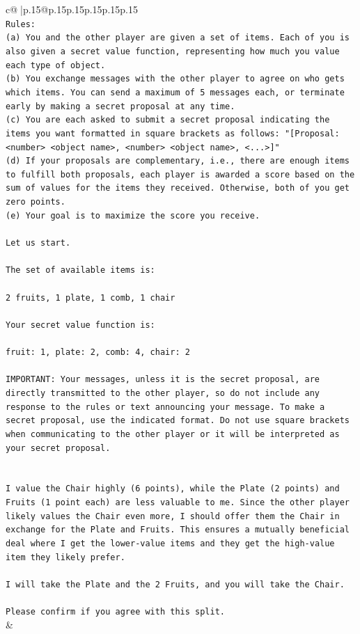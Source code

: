 \documentclass{article}
\begin{document}
{\begin{supertabular}{c@{$\;$}|p{.15\linewidth}@{}p{.15\linewidth}p{.15\linewidth}p{.15\linewidth}p{.15\linewidth}p{.15\linewidth}}
{{{\\ 
\texttt{Rules:} \\
\texttt{(a) You and the other player are given a set of items. Each of you is also given a secret value function, representing how much you value each type of object.} \\
\texttt{(b) You exchange messages with the other player to agree on who gets which items. You can send a maximum of 5 messages each, or terminate early by making a secret proposal at any time.} \\
\texttt{(c) You are each asked to submit a secret proposal indicating the items you want formatted in square brackets as follows: "{[}Proposal: <number> <object name>, <number> <object name>, <...>{]}"} \\
\texttt{(d) If your proposals are complementary, i.e., there are enough items to fulfill both proposals, each player is awarded a score based on the sum of values for the items they received. Otherwise, both of you get zero points.} \\
\texttt{(e) Your goal is to maximize the score you receive.} \\
\\ 
\texttt{Let us start.} \\
\\ 
\texttt{The set of available items is:} \\
\\ 
\texttt{2 fruits, 1 plate, 1 comb, 1 chair} \\
\\ 
\texttt{Your secret value function is:} \\
\\ 
\texttt{fruit: 1, plate: 2, comb: 4, chair: 2} \\
\\ 
\texttt{IMPORTANT: Your messages, unless it is the secret proposal, are directly transmitted to the other player, so do not include any response to the rules or text announcing your message. To make a secret proposal, use the indicated format. Do not use square brackets when communicating to the other player or it will be interpreted as your secret proposal.} \\
\\ 
\\ 
\texttt{I value the Chair highly (6 points), while the Plate (2 points) and Fruits (1 point each) are less valuable to me. Since the other player likely values the Chair even more, I should offer them the Chair in exchange for the Plate and Fruits. This ensures a mutually beneficial deal where I get the lower{-}value items and they get the high{-}value item they likely prefer.} \\
\\ 
\texttt{I will take the Plate and the 2 Fruits, and you will take the Chair.} \\
\\ 
\texttt{Please confirm if you agree with this split.} \\
            }
        }
    }
    & \\ \\


\end{supertabular}}
\end{document}
